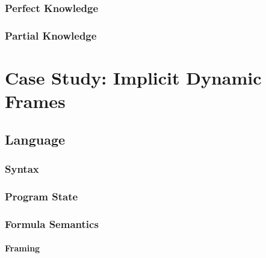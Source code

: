     \subsection{Perfect Knowledge}
    \label{ssec:perfect-knowledge}
    
    
    \subsection{Partial Knowledge}
    \label{ssec:atomic--knowledge}
    



\chapter{Case Study: Implicit Dynamic Frames}
\label{ch:case-study--implicit}


\section{Language}
\label{sec:language}


    \subsection{Syntax}
    \label{sec:syntax}
    
    
    \subsection{Program State}
    \label{ssec:program-state}
    
        
    \subsection{Formula Semantics}
    \label{ssec:formula-semantics}
    
    
        \subsubsection{Framing}
        \label{sssec:framing}
        
        
    
